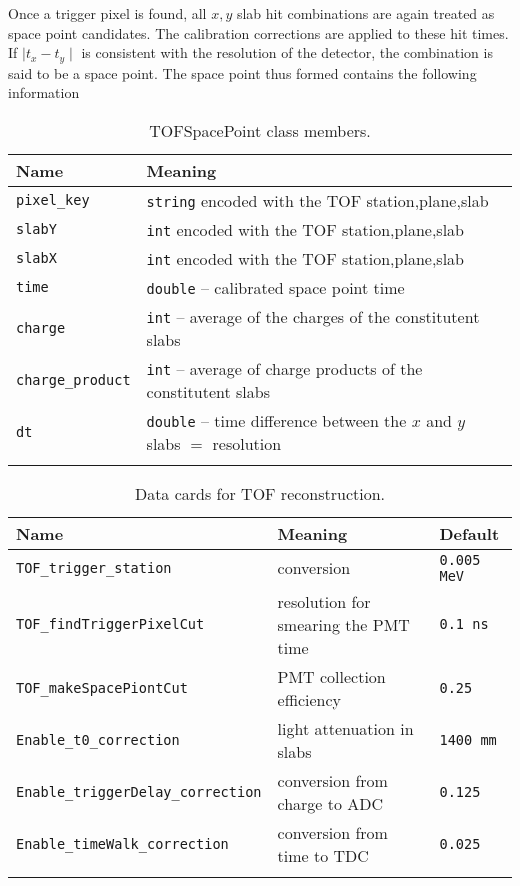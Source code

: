\begin{itemize}
Once a trigger pixel is found, all $x,y$ slab hit combinations are again treated as space point candidates. The calibration corrections are applied to these hit times. If $\mid t_x - t_y \mid$ is consistent with the resolution of the detector, the combination is said to be a space point. The space point thus formed contains the following information
\begin{table*}
\begin{center}
\caption{TOFSpacePoint class members.}
\begin{tabularx}{\linewidth}{lX}
\hline
Name & Meaning \\
\hline
\verb|pixel_key| & \verb|string| encoded with the TOF station,plane,slab\\
\verb|slabY| & \verb|int| encoded with the TOF station,plane,slab\\
\verb|slabX| & \verb|int| encoded with the TOF station,plane,slab\\
\verb|time| & \verb|double| -- calibrated space point time\\
\verb|charge| & \verb|int| -- average of the charges of the constitutent slabs\\
\verb|charge_product| & \verb|int| -- average of charge products of the constitutent slabs\\
\verb|dt| & \verb|double| -- time difference between the $x$ and $y$ slabs $=$ resolution\\
\begin{makeimage} %
\end{makeimage} 
\end{tabularx}
\end{center}
\end{table*}

\end{itemize}
\begin{table*}
\begin{center}
\caption{Data cards for TOF reconstruction.}
\begin{tabularx}{\linewidth}{lXX}
\hline
Name & Meaning & Default\\
\hline
\verb|TOF_trigger_station| & conversion & \verb|0.005 MeV|\\
\verb|TOF_findTriggerPixelCut| & resolution for smearing the PMT time& \verb|0.1 ns|\\
\verb|TOF_makeSpacePiontCut| & PMT collection efficiency & \verb|0.25| \\
\verb|Enable_t0_correction| & light attenuation in slabs & \verb|1400 mm|\\
\verb|Enable_triggerDelay_correction| & conversion from charge to ADC & \verb|0.125|\\
\verb|Enable_timeWalk_correction| & conversion from time to TDC & \verb|0.025|\\
\begin{makeimage} %
\end{makeimage} 
\end{tabularx}
\end{center}
\end{table*}

